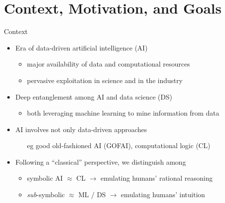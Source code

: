 \documentclass[presentation]{beamer}\mode<presentation>{\usetheme{AMSBolognaFC}}
\begin{document}
\section{Context, Motivation, and Goals}

\begin{frame}{Context}
    \begin{itemize}
        \item Era of \alert{data-driven} artificial intelligence (AI)
        \begin{itemize}
            \item major availability of \alert{data} and \alert{computational resources}
            \item pervasive exploitation in science and in the industry
        \end{itemize}

        \vfill

        \item Deep entanglement among AI and \alert{data science} (DS)
        \begin{itemize}
            \item both leveraging \alert{machine learning} to mine information from data
        \end{itemize}
        
        \vfill

        \item AI involves not only data-driven approaches
        \begin{itemize}
            \item[eg] good old-fashioned AI (GOFAI), \alert{computational logic} (CL) 
        \end{itemize}

        \vfill
        
        \item Following a ``classical'' perspective, we distinguish among
        \begin{itemize}
            \item \alert{symbolic} AI $\approx$ CL $\rightarrow$ emulating humans' \alert{rational reasoning}
            \item \alert{\emph{sub}-symbolic} $\approx$ ML / DS  $\rightarrow$ emulating humans' \alert{intuition}
        \end{itemize}
    \end{itemize}
\end{frame}
\end{document}
